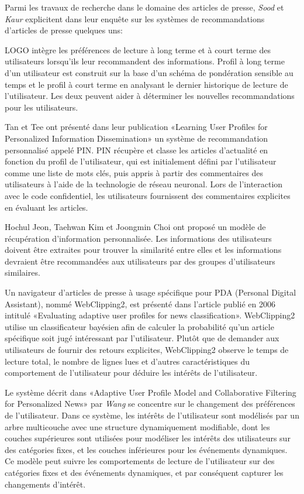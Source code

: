     Parmi les travaux de recherche dans le domaine des articles de presse, \emph{Sood} et \emph{Kaur}\cite{surveyrecommender1} explicitent dans leur enquête sur les systèmes de recommandations d'articles de presse quelques uns:

    LOGO\cite{27} intègre les préférences de lecture à long terme et à court terme des utilisateurs lorsqu'ils leur recommandent des informations. Profil à long terme d'un utilisateur est construit sur la base d'un schéma de pondération sensible au temps \cite{28} et le profil à court terme en analysant le dernier historique de lecture de l'utilisateur. Les deux peuvent aider à déterminer les nouvelles recommandations pour les utilisateurs.

    Tan et Tee \cite{29} ont présenté dans leur publication «Learning User Profiles for Personalized Information Dissemination» un système de recommandation personnalisé appelé PIN. PIN récupère et classe les articles d'actualité en fonction du profil de l'utilisateur, qui est initialement défini par l'utilisateur comme une liste de mots clés, puis appris à partir des commentaires des utilisateurs à l'aide de la technologie de réseau neuronal. Lors de l'interaction avec le code confidentiel, les utilisateurs fournissent des commentaires explicites en évaluant les articles.

    Hochul Jeon, Taehwan Kim et Joongmin Choi\cite{30} ont proposé un modèle de récupération d'information personnalisée. Les informations des utilisateurs doivent être extraites pour trouver la similarité entre elles et les informations devraient être recommandées aux utilisateurs par des groupes d'utilisateurs similaires.

    Un navigateur d'articles de presse à usage spécifique pour PDA (Personal Digital Assistant), nommé WebClipping2, est présenté dans l'article publié en 2006 intitulé «Evaluating adaptive user profiles for news classification»\cite{31}. WebClipping2 utilise un classificateur bayésien afin de calculer la probabilité qu'un article spécifique soit jugé intéressant par l'utilisateur. Plutôt que de demander aux utilisateurs de fournir des retours explicites, WebClipping2 observe le temps de lecture total, le nombre de lignes lues et d'autres caractéristiques du comportement de l'utilisateur pour déduire les intérêts de l'utilisateur.

    Le système décrit dans «Adaptive User Profile Model and Collaborative Filtering for Personalized News»\cite{32} par \emph{Wang} se concentre sur le changement des préférences de l'utilisateur. Dans ce système, les intérêts de l'utilisateur sont modélisés par un arbre multicouche avec une structure dynamiquement modifiable, dont les couches supérieures sont utilisées pour modéliser les intérêts des utilisateurs sur des catégories fixes, et les couches inférieures pour les événements dynamiques. Ce modèle peut suivre les comportements de lecture de l'utilisateur sur des catégories fixes et des événements dynamiques, et par conséquent capturer les changements d'intérêt.

